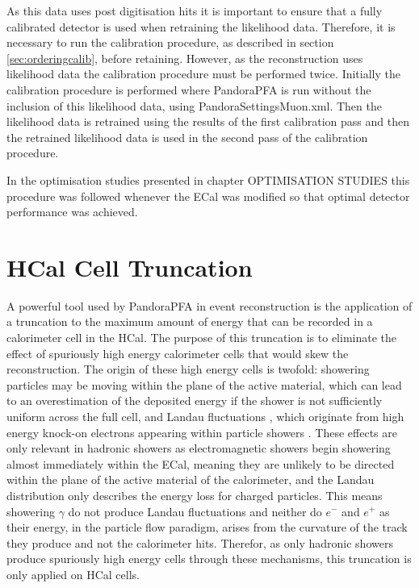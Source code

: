 As this data uses post digitisation hits it is important to ensure that a fully calibrated detector is used when retraining the likelihood data.  Therefore, it is necessary to run the calibration procedure, as described in section \ref{sec:orderingcalib}, before retaining.  However, as the reconstruction uses likelihood data the calibration procedure must be performed twice.  Initially the calibration procedure is performed where PandoraPFA is run without the inclusion of this likelihood data, using PandoraSettingsMuon.xml.  Then the likelihood data is retrained using the results of the first calibration pass and then the retrained likelihood data is used in the second pass of the calibration procedure.  

In the optimisation studies presented in chapter OPTIMISATION STUDIES this procedure was followed whenever the ECal was modified so that optimal detector performance was achieved.  


\section{HCal Cell Truncation}
\label{sec:hcalcelltruncation}
A powerful tool used by PandoraPFA in event reconstruction is the application of a truncation to the maximum amount of energy that can be recorded in a calorimeter cell in the HCal.  The purpose of this truncation is to eliminate the effect of spuriously high energy calorimeter cells that would skew the reconstruction.  The origin of these high energy cells is twofold: showering particles may be moving within the plane of the active material, which can lead to an overestimation of the deposited energy if the shower is not sufficiently uniform across the full cell, and Landau fluctuations \cite{Landau:1944if}, which originate from high energy knock-on electrons appearing within particle showers \cite{Bichsel:2004ej}.  These effects are only relevant in hadronic showers as electromagnetic showers begin showering almost immediately within the ECal, meaning they are unlikely to be directed within the plane of the active material of the calorimeter, and the Landau distribution only describes the energy loss for charged particles.  This means showering $\gamma$ do not produce Landau fluctuations and neither do $e^{-}$ and $e^{+}$ as their energy, in the particle flow paradigm, arises from the curvature of the track they produce and not the calorimeter hits.  Therefor, as only hadronic showers produce spuriously high energy cells through these mechanisms, this truncation is only applied on HCal cells.  

